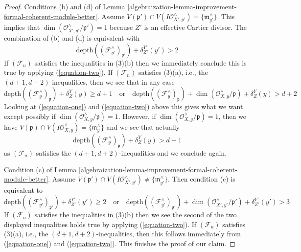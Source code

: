 \begin{proof}
\medskip\noindent
Conditions (b) and (d) of
Lemma \ref{algebraization-lemma-improvement-formal-coherent-module-better}. Assume
$V(\mathfrak p') \cap V(I\mathcal{O}_{X', y'}^\wedge) =
\{\mathfrak m_{y'}^\wedge\}$.
This implies that $\dim(\mathcal{O}_{X', y'}^\wedge/\mathfrak p') = 1$
because $Z'$ is an effective Cartier divisor.
The combination of (b) and (d) is equivalent with
$$
\text{depth}((\mathcal{F}_{y'}^\wedge)_{\mathfrak p'}) + \delta^{Y'}_{Z'}(y')
> 2
$$
If $(\mathcal{F}_n)$ satisfies the inequalities in (3)(b)
then we immediately conclude this is true by applying (\ref{equation-two}).
If $(\mathcal{F}_n)$ satisfies (3)(a), i.e., the
$(d + 1, d + 2)$-inequalities, then we see that in any case
$$
\text{depth}((\mathcal{F}_y^\wedge)_{\mathfrak p}) + \delta^Y_Z(y)
\geq d + 1
\quad\text{or}\quad
\text{depth}((\mathcal{F}_y^\wedge)_{\mathfrak p}) +
\dim(\mathcal{O}_{X, y}^\wedge/\mathfrak p) +
\delta^Y_Z(y) > d + 2
$$
Looking at (\ref{equation-one}) and (\ref{equation-two}) above this gives
what we want except possibly if
$\dim(\mathcal{O}_{X, y}^\wedge/\mathfrak p) = 1$.
However, if $\dim(\mathcal{O}_{X, y}^\wedge/\mathfrak p) = 1$, then we have
$V(\mathfrak p) \cap V(I\mathcal{O}_{X, y}^\wedge) = \{\mathfrak m_y^\wedge\}$
and we see that actually
$$
\text{depth}((\mathcal{F}_y^\wedge)_{\mathfrak p}) + \delta^Y_Z(y) > d + 1
$$
as $(\mathcal{F}_n)$ satisfies the $(d + 1, d + 2)$-inequalities and we
conclude again.

\medskip\noindent
Condition (c) of
Lemma \ref{algebraization-lemma-improvement-formal-coherent-module-better}. Assume
$V(\mathfrak p') \cap V(I\mathcal{O}_{X', y'}^\wedge) \not =
\{\mathfrak m_{y'}^\wedge\}$. Then condition (c) is equivalent to
$$
\text{depth}((\mathcal{F}_{y'}^\wedge)_{\mathfrak p'}) + \delta^{Y'}_{Z'}(y')
\geq 2
\quad\text{or}\quad
\text{depth}((\mathcal{F}_{y'}^\wedge)_{\mathfrak p'}) +
\dim(\mathcal{O}_{X', y'}^\wedge/\mathfrak p') +
\delta^{Y'}_{Z'}(y') > 3
$$
If $(\mathcal{F}_n)$ satisfies the inequalities in (3)(b)
then we see the second of the two displayed inequalities holds true
by applying (\ref{equation-two}). If $(\mathcal{F}_n)$ satisfies (3)(a), i.e.,
the $(d + 1, d + 2)$-inequalities, then this follows immediately from
(\ref{equation-one}) and (\ref{equation-two}).
This finishes the proof of our claim.


\end{proof}
